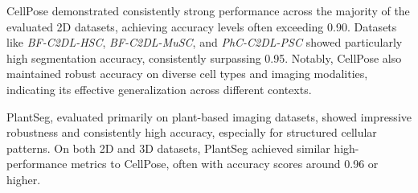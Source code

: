 \documentclass[./dissertation.tex]{subfiles}
\begin{document}
CellPose demonstrated consistently strong performance across the majority of the evaluated 2D datasets, achieving accuracy levels often exceeding 0.90. Datasets like \textit{BF-C2DL-HSC}, \textit{BF-C2DL-MuSC}, and \textit{PhC-C2DL-PSC} showed particularly high segmentation accuracy, consistently surpassing 0.95. Notably, CellPose also maintained robust accuracy on diverse cell types and imaging modalities, indicating its effective generalization across different contexts.

PlantSeg, evaluated primarily on plant-based imaging datasets, showed impressive robustness and consistently high accuracy, especially for structured cellular patterns. On both 2D and 3D datasets, PlantSeg achieved similar high-performance metrics to CellPose, often with accuracy scores around 0.96 or higher.
\end{document}
